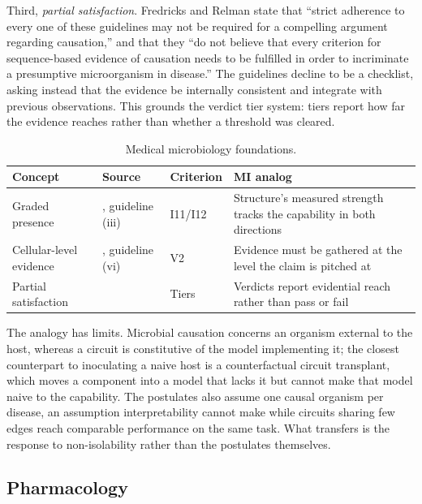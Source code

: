 \documentclass{article}
\begin{document}
Third, \emph{partial satisfaction}. Fredricks and Relman state that ``strict adherence to every one of these guidelines may not be required for a compelling argument regarding causation,'' and that they ``do not believe that every criterion for sequence-based evidence of causation needs to be fulfilled in order to incriminate a presumptive microorganism in disease.'' The guidelines decline to be a checklist, asking instead that the evidence be internally consistent and integrate with previous observations. This grounds the verdict tier system: tiers report how far the evidence reaches rather than whether a threshold was cleared.

\begin{table}[H]
\centering\small
\caption{Medical microbiology foundations.}
\renewcommand{\arraystretch}{1.12}
\begin{tabular}{@{}l>{\raggedright\arraybackslash}p{2.2cm}l>{\raggedright\arraybackslash}p{4.5cm}@{}}
\toprule
\textbf{Concept} & \textbf{Source} & \textbf{Criterion} & \textbf{MI analog} \\
\midrule
Graded presence & \citet{fredricks1996sequence}, guideline (iii) & I11/I12 & Structure's measured strength tracks the capability in both directions \\
\midrule
Cellular-level evidence & \citet{fredricks1996sequence}, guideline (vi) & V2 & Evidence must be gathered at the level the claim is pitched at \\
\midrule
Partial satisfaction & \citet{fredricks1996sequence} & Tiers & Verdicts report evidential reach rather than pass or fail \\
\bottomrule
\end{tabular}
\end{table}

The analogy has limits. Microbial causation concerns an organism external to the host, whereas a circuit is constitutive of the model implementing it; the closest counterpart to inoculating a naive host is a counterfactual circuit transplant, which moves a component into a model that lacks it but cannot make that model naive to the capability. The postulates also assume one causal organism per disease, an assumption interpretability cannot make while circuits sharing few edges reach comparable performance on the same task. What transfers is the response to non-isolability rather than the postulates themselves.


\subsection{Pharmacology}
\label{sec:pharma}
\end{document}
